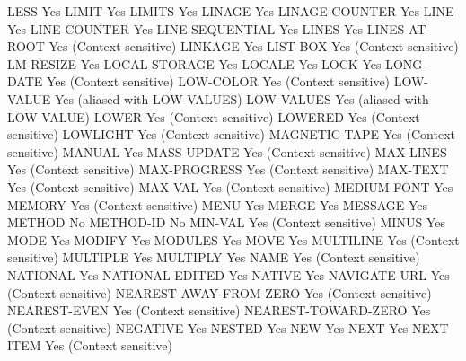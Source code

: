 LESS                            Yes
LIMIT                           Yes
LIMITS                          Yes
LINAGE                          Yes
LINAGE-COUNTER                  Yes
LINE                            Yes
LINE-COUNTER                    Yes
LINE-SEQUENTIAL                 Yes
LINES                           Yes
LINES-AT-ROOT                   Yes (Context sensitive)
LINKAGE                         Yes
LIST-BOX                        Yes (Context sensitive)
LM-RESIZE                       Yes
LOCAL-STORAGE                   Yes
LOCALE                          Yes
LOCK                            Yes
LONG-DATE                       Yes (Context sensitive)
LOW-COLOR                       Yes (Context sensitive)
LOW-VALUE                       Yes (aliased with LOW-VALUES)
LOW-VALUES                      Yes (aliased with LOW-VALUE)
LOWER                           Yes (Context sensitive)
LOWERED                         Yes (Context sensitive)
LOWLIGHT                        Yes (Context sensitive)
MAGNETIC-TAPE                   Yes (Context sensitive)
MANUAL                          Yes
MASS-UPDATE                     Yes (Context sensitive)
MAX-LINES                       Yes (Context sensitive)
MAX-PROGRESS                    Yes (Context sensitive)
MAX-TEXT                        Yes (Context sensitive)
MAX-VAL                         Yes (Context sensitive)
MEDIUM-FONT                     Yes
MEMORY                          Yes (Context sensitive)
MENU                            Yes
MERGE                           Yes
MESSAGE                         Yes
METHOD                          No
METHOD-ID                       No
MIN-VAL                         Yes (Context sensitive)
MINUS                           Yes
MODE                            Yes
MODIFY                          Yes
MODULES                         Yes
MOVE                            Yes
MULTILINE                       Yes (Context sensitive)
MULTIPLE                        Yes
MULTIPLY                        Yes
NAME                            Yes (Context sensitive)
NATIONAL                        Yes
NATIONAL-EDITED                 Yes
NATIVE                          Yes
NAVIGATE-URL                    Yes (Context sensitive)
NEAREST-AWAY-FROM-ZERO          Yes (Context sensitive)
NEAREST-EVEN                    Yes (Context sensitive)
NEAREST-TOWARD-ZERO             Yes (Context sensitive)
NEGATIVE                        Yes
NESTED                          Yes
NEW                             Yes
NEXT                            Yes
NEXT-ITEM                       Yes (Context sensitive)
